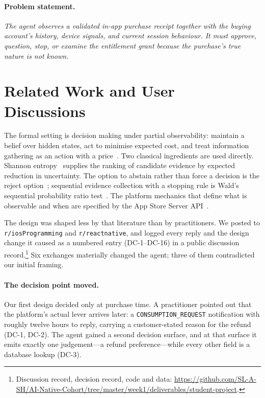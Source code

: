 \documentclass{article}
\begin{document}
\paragraph{Problem statement.} \emph{The agent observes a validated in-app purchase receipt
together with the buying account's history, device signals, and current session behaviour.
It must approve, question, stop, or examine the entitlement grant because the purchase's
true nature is not known.}

\section{Related Work and User Discussions}
\label{sec:related}

The formal setting is decision making under partial observability: maintain a belief over
hidden states, act to minimise expected cost, and treat information gathering as an action
with a price~\cite{kochenderfer2015}. Two classical ingredients are used directly. Shannon
entropy~\cite{shannon1948} supplies the ranking of candidate evidence by expected reduction
in uncertainty. The option to abstain rather than force a decision is the reject
option~\cite{chow1970}; sequential evidence collection with a stopping rule is Wald's
sequential probability ratio test~\cite{wald1945}. The platform mechanics that define what
is observable and when are specified by the App Store Server
API~\cite{apple_customerconsented,apple_refundpreference}.

The design was shaped less by that literature than by practitioners. We posted to
\texttt{r/iosProgramming} and \texttt{r/reactnative}, and logged every reply and the design
change it caused as a numbered entry (DC-1--DC-16) in a public discussion
record.\footnote{Discussion record, decision record, code and data:
\url{https://github.com/SL-A-SH/AI-Native-Cohort/tree/master/week1/deliverables/student-project}.} Six
exchanges materially changed the agent; three of them contradicted our initial framing.

\paragraph{The decision point moved.} Our first design decided only at purchase time. A
practitioner pointed out that the platform's actual lever arrives later: a
\texttt{CONSUMPTION\_REQUEST} notification with roughly twelve hours to reply, carrying a
customer-stated reason for the refund (DC-1, DC-2). The agent gained a second decision
surface, and at that surface it emits exactly one judgement---a refund
preference---while every other field is a database lookup (DC-3).
\end{document}
